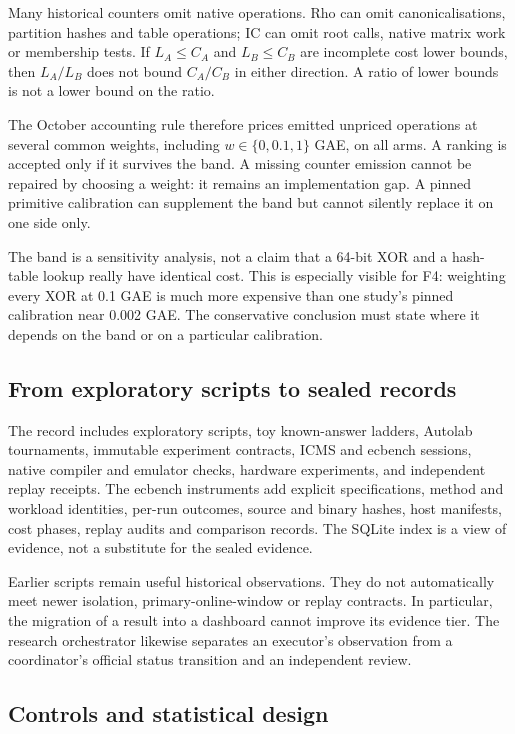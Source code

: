 Many historical counters omit native operations. Rho can omit
canonicalisations, partition hashes and table operations; IC can omit
root calls, native matrix work or membership tests. If $L_A\le C_A$ and
$L_B\le C_B$ are incomplete cost lower bounds, then $L_A/L_B$ does not
bound $C_A/C_B$ in either direction. A ratio of lower bounds is not a
lower bound on the ratio.

The October accounting rule therefore prices emitted unpriced operations
at several common weights, including $w\in\{0,0.1,1\}$ GAE, on all arms.
A ranking is accepted only if it survives the band. A missing counter
emission cannot be repaired by choosing a weight: it remains an
implementation gap. A pinned primitive calibration can supplement the
band but cannot silently replace it on one side only.

The band is a sensitivity analysis, not a claim that a 64-bit XOR and a
hash-table lookup really have identical cost. This is especially visible
for F4: weighting every XOR at 0.1 GAE is much more expensive than one
study's pinned calibration near 0.002 GAE. The conservative conclusion
must state where it depends on the band or on a particular calibration.

\subsection{From exploratory scripts to sealed records}

The record includes exploratory scripts, toy known-answer ladders,
Autolab tournaments, immutable experiment contracts, ICMS and ecbench
sessions, native compiler and emulator checks, hardware experiments,
and independent replay receipts. The ecbench instruments add explicit
specifications, method and workload identities, per-run outcomes, source
and binary hashes, host manifests, cost phases, replay audits and
comparison records. The SQLite index is a view of evidence, not a
substitute for the sealed evidence.

Earlier scripts remain useful historical observations. They do not
automatically meet newer isolation, primary-online-window or replay
contracts. In particular, the migration of a result into a dashboard
cannot improve its evidence tier. The research orchestrator likewise
separates an executor's observation from a coordinator's official status
transition and an independent review.

\subsection{Controls and statistical design}

